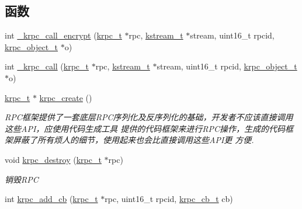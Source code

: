 \subsection*{函数}
\begin{DoxyCompactItemize}
\item 
int \hyperlink{a00086_a81438b66394a3d6bf42c1971fefeb67c_a81438b66394a3d6bf42c1971fefeb67c}{\+\_\+krpc\+\_\+call\+\_\+encrypt} (\hyperlink{a00051_a1e414ac6f6de24462ccf81e10f63428d_a1e414ac6f6de24462ccf81e10f63428d}{krpc\+\_\+t} $\ast$rpc, \hyperlink{a00051_acc208c4c40c875eebbfef88f00fffacf_acc208c4c40c875eebbfef88f00fffacf}{kstream\+\_\+t} $\ast$stream, uint16\+\_\+t rpcid, \hyperlink{a00051_a9c07dfc8c3b965f75b09f82fdb1bbb1e_a9c07dfc8c3b965f75b09f82fdb1bbb1e}{krpc\+\_\+object\+\_\+t} $\ast$o)
\item 
int \hyperlink{a00086_a8e2ea426099ea032432a9aeb24088cf0_a8e2ea426099ea032432a9aeb24088cf0}{\+\_\+krpc\+\_\+call} (\hyperlink{a00051_a1e414ac6f6de24462ccf81e10f63428d_a1e414ac6f6de24462ccf81e10f63428d}{krpc\+\_\+t} $\ast$rpc, \hyperlink{a00051_acc208c4c40c875eebbfef88f00fffacf_acc208c4c40c875eebbfef88f00fffacf}{kstream\+\_\+t} $\ast$stream, uint16\+\_\+t rpcid, \hyperlink{a00051_a9c07dfc8c3b965f75b09f82fdb1bbb1e_a9c07dfc8c3b965f75b09f82fdb1bbb1e}{krpc\+\_\+object\+\_\+t} $\ast$o)
\item 
\hyperlink{a00051_a1e414ac6f6de24462ccf81e10f63428d_a1e414ac6f6de24462ccf81e10f63428d}{krpc\+\_\+t} $\ast$ \hyperlink{a00086_a5d55f838d222f44965d99eac9a0381c1_a5d55f838d222f44965d99eac9a0381c1}{krpc\+\_\+create} ()
\begin{DoxyCompactList}\small\item\em R\+P\+C框架提供了一套底层\+R\+P\+C序列化及反序列化的基础，开发者不应该直接调用这些\+A\+P\+I，应使用代码生成工具 提供的代码框架来进行\+R\+P\+C操作，生成的代码框架屏蔽了所有烦人的细节，使用起来也会比直接调用这些\+A\+P\+I更 方便. \end{DoxyCompactList}\item 
void \hyperlink{a00086_ab07c8ccf1abc99b85f455a2f4280ac76_ab07c8ccf1abc99b85f455a2f4280ac76}{krpc\+\_\+destroy} (\hyperlink{a00051_a1e414ac6f6de24462ccf81e10f63428d_a1e414ac6f6de24462ccf81e10f63428d}{krpc\+\_\+t} $\ast$rpc)
\begin{DoxyCompactList}\small\item\em 销毁\+R\+P\+C \end{DoxyCompactList}\item 
int \hyperlink{a00086_aa12a9874d2b0308994c3fa651cdbbd61_aa12a9874d2b0308994c3fa651cdbbd61}{krpc\+\_\+add\+\_\+cb} (\hyperlink{a00051_a1e414ac6f6de24462ccf81e10f63428d_a1e414ac6f6de24462ccf81e10f63428d}{krpc\+\_\+t} $\ast$rpc, uint16\+\_\+t rpcid, \hyperlink{a00051_a06bb708c1b97445d3a5d0c1b32ad2ab6_a06bb708c1b97445d3a5d0c1b32ad2ab6}{krpc\+\_\+cb\+\_\+t} cb)

\end{DoxyCompactItemize}
